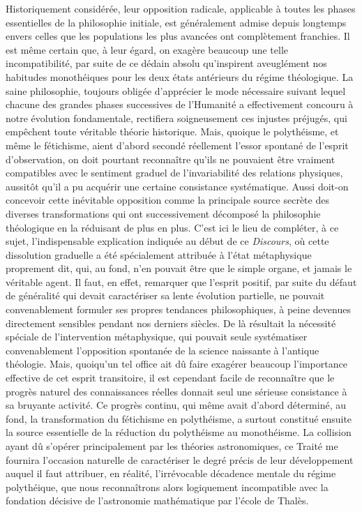 \documentclass[french,twoside]{book} %
\begin{document}
Historiquement considérée, leur opposition radicale, applicable à toutes les phases essentielles de la philosophie initiale, est généralement admise depuis longtemps envers celles que les populations les plus avancées ont complètement franchies. Il est même certain que, à leur égard, on exagère beaucoup une telle incompatibilité, par suite de ce dédain absolu qu’inspirent aveuglément nos habitudes monothéiques pour les deux états antérieurs du régime théologique. La saine philosophie, toujours obligée d’apprécier le mode nécessaire suivant lequel chacune des grandes phases successives de l’Humanité a effectivement concouru à notre évolution fondamentale, rectifiera soigneusement ces injustes préjugés, qui empêchent toute véritable théorie historique. Mais, quoique le polythéisme, et même le fétichisme, aient d’abord secondé réellement l’essor spontané de l’esprit d’observation, on doit pourtant reconnaître qu’ils ne pouvaient être vraiment compatibles avec le sentiment graduel de l’invariabilité des relations physiques, aussitôt qu’il a pu acquérir une certaine consistance systématique. Aussi doit-on concevoir cette inévitable opposition comme la principale source secrète des diverses transformations qui ont successivement décomposé la philosophie théologique en la réduisant de plus en plus. C’est ici le lieu de compléter, à ce sujet, l’indispensable explication indiquée au début de ce {\itshape Discours}, où cette dissolution graduelle a été spécialement attribuée à l’état métaphysique proprement dit, qui, au fond, n’en pouvait être que le simple organe, et jamais le véritable agent. Il faut, en effet, remarquer que l’esprit positif, par suite du défaut de généralité qui devait caractériser sa lente évolution partielle, ne pouvait convenablement formuler ses propres tendances philosophiques, à peine devenues directement sensibles pendant nos derniers siècles. De là résultait la nécessité spéciale de l’intervention métaphysique, qui pouvait seule systématiser convenablement l’opposition spontanée de la science naissante à l’antique théologie. Mais, quoiqu’un tel office ait dû faire exagérer beaucoup l’importance effective de cet esprit transitoire, il est cependant facile de reconnaître que le progrès naturel des connaissances réelles donnait seul une sérieuse consistance à sa bruyante activité. Ce progrès continu, qui même avait d’abord déterminé, au fond, la transformation du fétichisme en polythéisme, a surtout constitué ensuite la source essentielle de la réduction du polythéisme au monothéisme. La collision ayant dû s’opérer principalement par les théories astronomiques, ce Traité me fournira l’occasion naturelle de caractériser le degré précis de leur développement auquel il faut attribuer, en réalité, l’irrévocable décadence mentale du régime polythéique, que nous reconnaîtrons alors logiquement incompatible avec la fondation décisive de l’astronomie mathématique par l’école de Thalès.\par
\end{document}
